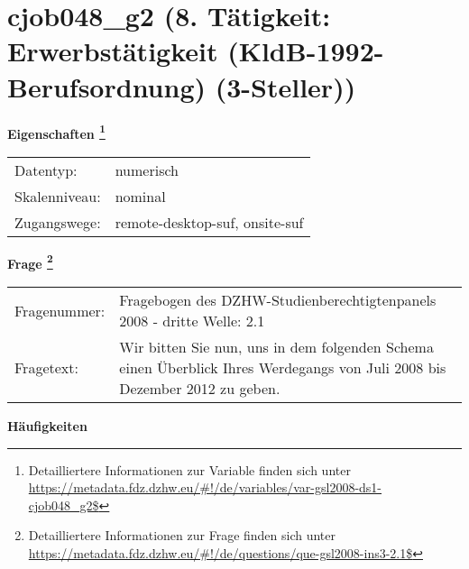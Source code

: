 
    \setcounter{footnote}{0}

    \vspace*{-1.8cm}
	\section{cjob048\_g2 (8. Tätigkeit: Erwerbstätigkeit (KldB-1992-Berufsordnung) (3-Steller))}
	\label{section:cjob048_g2}



    \vspace*{0.5cm}
    \noindent\textbf{Eigenschaften
	\footnote{Detailliertere Informationen zur Variable finden sich unter
		\url{https://metadata.fdz.dzhw.eu/\#!/de/variables/var-gsl2008-ds1-cjob048_g2$}}}\\
	\begin{tabularx}{\hsize}{@{}lX}
	Datentyp: & numerisch \\
	Skalenniveau: & nominal \\
	Zugangswege: &
	  remote-desktop-suf, 
	  onsite-suf
 \\
    \end{tabularx}



				\vspace*{0.5cm}
                \noindent\textbf{Frage
	                \footnote{Detailliertere Informationen zur Frage finden sich unter
		              \url{https://metadata.fdz.dzhw.eu/\#!/de/questions/que-gsl2008-ins3-2.1$}}}\\
				\begin{tabularx}{\hsize}{@{}lX}
					Fragenummer: &
					  Fragebogen des DZHW-Studienberechtigtenpanels 2008 - dritte Welle:
					  2.1
 \\
					Fragetext: & Wir bitten Sie nun, uns in dem folgenden Schema einen Überblick Ihres Werdegangs von Juli 2008 bis Dezember 2012 zu geben. \\
				\end{tabularx}





        		\vspace*{0.5cm}
                \noindent\textbf{Häufigkeiten}

